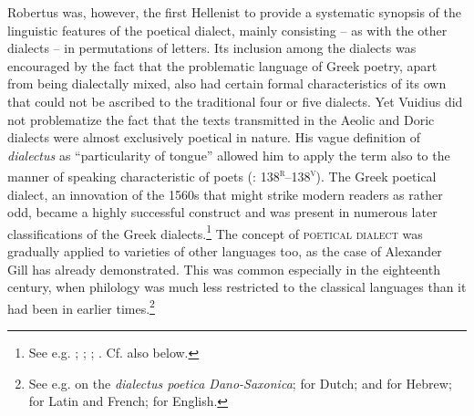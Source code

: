 {Robertus \citet[146\textsc{\textsuperscript{v}}–148\textsc{\textsuperscript{v}}]{Vuidius1569} was, however, the first Hellenist to provide a systematic synopsis of the linguistic features of the poetical dialect, mainly consisting – as with the other dialects – in permutations of letters. Its inclusion among the dialects was encouraged by the fact that the problematic language of Greek poetry, apart from being dialectally mixed, also had certain formal characteristics of its own that could not be ascribed to the traditional four or five dialects. Yet Vuidius did not problematize the fact that the texts transmitted in the Aeolic and Doric dialects were almost exclusively poetical in nature. His vague definition of \textit{dialectus} as “particularity of tongue” allowed him to apply the term also to the manner of speaking characteristic of poets (\citealt{Vuidius1569}: 138\textsc{\textsuperscript{r}}–138\textsc{\textsuperscript{v}}). The Greek poetical dialect, an innovation of the 1560s that might strike modern readers as rather odd, became a highly successful construct and was present in numerous later classifications of the Greek dialects.\footnote{See e.g. \citet[\textsc{x}.1\textsc{\textsuperscript{v}}]{Dabercusius1577}; \citet[\textsc{i.1}\textsc{\textsuperscript{v}}]{Camden1595}; \citet[376--377]{Kober1701}; \citet[113]{Petisco1764}. Cf. also  below.} The concept of \textsc{poetical} \textsc{dialect} was gradually applied to varieties of other languages too, as the case of Alexander Gill has already demonstrated. This was common especially in the eighteenth century, when philology was much less restricted to the classical languages than it had been in earlier times.\footnote{See e.g. \citet[101]{Hickes1705} on the \textit{dialectus poetica Dano-Saxonica}; \citet[*.3\textsc{\textsuperscript{r}}]{Verwer1707} for Dutch; \citet[24]{Wesley1736} and \citet{Vogel1764} for Hebrew; \citet[240, 241]{Beattie1778} for Latin and French; \citet[292]{Macnicol1779} for English.}

}
